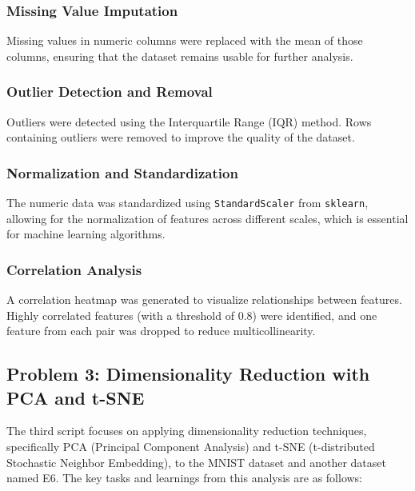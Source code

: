 \documentclass{article}
\begin{document}
\subsubsection{Missing Value Imputation}
Missing values in numeric columns were replaced with the mean of those columns, ensuring that the dataset remains usable for further analysis.

\subsubsection{Outlier Detection and Removal}
Outliers were detected using the Interquartile Range (IQR) method. Rows containing outliers were removed to improve the quality of the dataset.

\subsubsection{Normalization and Standardization}
The numeric data was standardized using \texttt{StandardScaler} from \texttt{sklearn}, allowing for the normalization of features across different scales, which is essential for machine learning algorithms.

\subsubsection{Correlation Analysis}
A correlation heatmap was generated to visualize relationships between features. Highly correlated features (with a threshold of 0.8) were identified, and one feature from each pair was dropped to reduce multicollinearity.

\subsection{Problem 3: Dimensionality Reduction with PCA and t-SNE}
The third script focuses on applying dimensionality reduction techniques, specifically PCA (Principal Component Analysis) and t-SNE (t-distributed Stochastic Neighbor Embedding), to the MNIST dataset and another dataset named E6. The key tasks and learnings from this analysis are as follows:
\end{document}
